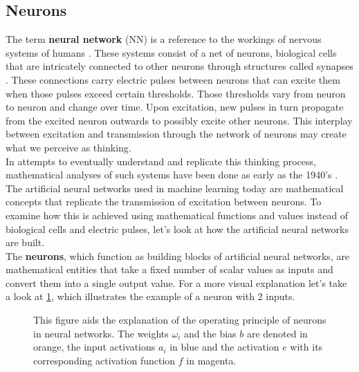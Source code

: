 \subsection{Neurons}
The term \textbf{neural network} (NN) is a reference to the workings of nervous systems of humans \cite{NeuralNetworkLiteratureReview}. These systems consist of a net of neurons, biological cells that are intricately connected to other neurons through structures called synapses \cite{PrinciplesOfBrainFunctioningHaken}. These connections carry electric pulses between neurons that can excite them when those pulses exceed certain thresholds. Those thresholds vary from neuron to neuron and change over time. Upon excitation, new pulses in turn propagate from the excited neuron outwards to possibly excite other neurons. This interplay between excitation and transmission through the network of neurons may create what we perceive as thinking.\\
In attempts to eventually understand and replicate this thinking process, mathematical analyses of such systems  have been done as early as the 1940's \cite{A_logical_calculus_of_the_ideas_immanent_in_nervous_activity}. The artificial neural networks used in machine learning today are mathematical concepts that replicate the transmission of excitation between neurons. To examine how this is achieved using mathematical functions and values instead of biological cells and electric pulses, let's look at how the artificial neural networks are built.\\
The \textbf{neurons}, which function as building blocks of artificial neural networks, are mathematical entities that take a fixed number of scalar values as inputs and convert them into a single output value. For a more visual explanation let's take a look at \cref{fig:Neuron_explanation}, which illustrates the example of a neuron with 2 inputs.
\begin{figure}
	\centering
	
	\caption{This figure aids the explanation of the operating principle of neurons in neural networks. The weights $\omega_i$ and the bias $b$ are denoted in orange, the input activations $a_i$ in blue and the activation $e$ with its corresponding activation function $f$ in magenta.}
	\label{fig:Neuron_explanation}
\end{figure}
